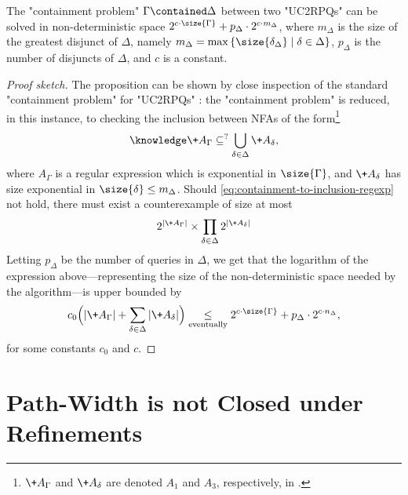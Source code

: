 \begin{proposition}
	\AP\label{prop:bound-containment-pb-alt}
	The "containment problem" $\Gamma \contained \Delta$ between two "UC2RPQs" can be solved in non-deterministic space $2^{c\cdot \size{\Gamma}} + p_{\Delta} \cdot 2^{c\cdot m_\Delta}$, where $m_\Delta$ is the size of the greatest disjunct of $\Delta$, namely $m_\Delta = \max{\{\size{\delta_\Delta} \mid \delta \in \Delta\}}$, $p_\Delta$
	is the number of disjuncts of $\Delta$, and $c$ is a constant.
\end{proposition}

\begin{proof}[Proof sketch]
    The proposition can be shown by close inspection of the standard "containment problem" for "UC2RPQs" \cite[Theorem 5]{CalvaneseDeGiacomoLenzeriniVardi2000Containment}: the "containment problem" is reduced, in this instance, to checking the inclusion between NFAs of the form\footnote{$\+A_\Gamma$ and $\+A_\delta$ are denoted $A_1$ and $A_3$, respectively, in \cite{CalvaneseDeGiacomoLenzeriniVardi2000Containment}.}
	\begin{equation}
		\AP\label{eq:containment-to-inclusion-regexp}
		\+A_\Gamma \subseteq^? \bigcup_{\delta \in \Delta} \+A_\delta,
	\end{equation}
	where $A_\Gamma$ is a regular expression which is exponential in $\size{\Gamma}$,
	and $\+A_\delta$ has size exponential in $\size{\delta} \leq m_\Delta$.
	Should \eqref{eq:containment-to-inclusion-regexp} not hold, there must exist a counterexample of size at most 
	\[
		2^{|\+A_\Gamma|}\times \prod_{\delta \in \Delta} 2^{|\+A_\delta|}
	\]
	Letting $p_\Delta$ be the number
	of queries in $\Delta$, we get that the logarithm of the expression above---representing the
	size of the non-deterministic space needed by the algorithm---is upper bounded by
	\[
		c_0 \Bigl(|\+A_\Gamma| + \sum_{\delta \in \Delta} |\+A_\delta|\Bigr)
		\mathrel{\underset{\tiny\textrm{eventually}}{\leq}}
		2^{c\cdot \size{\Gamma}} + p_{\Delta} \cdot 2^{c\cdot n_\Delta},
	\]
	for some constants $c_0$ and $c$.
\end{proof}

\section{\AP{}Path-Width is not Closed under Refinements}
\label{apdx-sec:path-width-not-closed-refinements}

\pathwidthnotclosed*

